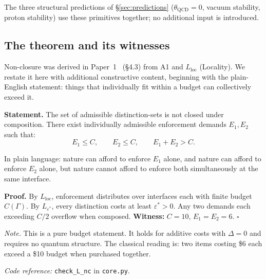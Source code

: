 \documentclass[11pt]{article}
\newcommand{\coderef}[2]{\smallskip\noindent\textit{Code reference:} \texttt{#1} in \texttt{#2}.}
\begin{document}
\begin{tcolorbox}[apfbox, title={Operational primitives: where each structural term is defined and used}]
\noindent The three structural predictions of \S\ref{sec:predictions} ($\theta_{\mathrm{QCD}} = 0$, vacuum stability, proton stability) use these primitives together; no additional input is introduced.
\end{tcolorbox}

\subsection{The theorem and its witnesses}

Non-closure was derived in Paper~1~\cite{BrookePaper1} (\S4.3) from A1 and $L_{\mathrm{loc}}$ (Locality).  We restate it here with additional constructive content, beginning with the plain-English statement: things that individually fit within a budget can collectively exceed it.

\begin{tcolorbox}[apfbox, title={Lemma $L_{\mathrm{nc}}^{\mathrm{budget}}$ (Budget Non-Closure)}]
\textbf{Statement.}  The set of admissible distinction-sets is not closed under composition.  There exist individually admissible enforcement demands $E_1, E_2$ such that:
\begin{equation}
E_1 \le C, \qquad E_2 \le C, \qquad E_1 + E_2 > C.
\label{eq:nonclosure}
\end{equation}

In plain language: nature can afford to enforce $E_1$ alone, and nature can afford to enforce $E_2$ alone, but nature cannot afford to enforce both simultaneously at the same interface.

\smallskip\noindent\textbf{Proof.}  By $L_{\mathrm{loc}}$, enforcement distributes over interfaces each with finite budget $C(\Gamma)$.  By $L_{\varepsilon^*}$, every distinction costs at least $\varepsilon^* > 0$.  Any two demands each exceeding $C/2$ overflow when composed.  \textbf{Witness:} $C = 10$, $E_1 = E_2 = 6$.  $\square$

\smallskip\noindent\textit{Note.}  This is a pure budget statement.  It holds for additive costs with $\Delta = 0$ and requires no quantum structure.  The classical reading is: two items costing \$6 each exceed a \$10 budget when purchased together.

\coderef{check\_L\_nc}{core.py}
\end{tcolorbox}
\end{document}

